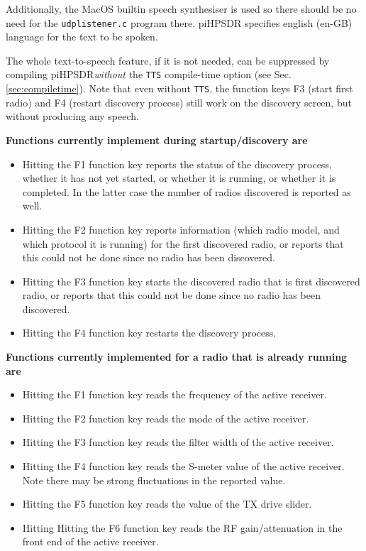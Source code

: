\documentclass[12pt]{book}
\def\rett#1{\texttt{\color{red}#1}}
\def\pH{pi\-HPSDR\xspace}
\begin{document}
Additionally, the MacOS builtin speech synthesiser is used so there should be no need
for the \texttt{udplistener.c} program there. \pH specifies english (en-GB)
language for the text to be spoken.

The whole text-to-speech feature, if it is not needed, can be suppressed by compiling
\pH \textit{without} the \texttt{TTS} compile-time option (see Sec. \ref{sec:compiletime}).
Note that even without \texttt{TTS},
the function keys F3 (start first radio) and F4 (restart
discovery process) still work on the discovery screen, but without producing any speech.

\textbf{Functions currently implement during startup/discovery are}

\begin{itemize}
\item[\rett{F1}]{Hitting the F1 function key reports the status of the discovery process,
whether it has not yet started, or whether it is running, or whether it is completed.
In the latter case the number of radios discovered is reported as well.}

\item[\rett{F2}]{Hitting the F2 function key reports information (which radio model, and
which protocol it is running) for the first discovered radio,
or reports that  this could not be done since no radio has been
discovered.}

\item[\rett{F3}]{Hitting the F3 function key starts the discovered radio that is first
discovered radio, or reports that  this could not be done since no radio has been
discovered.}
\item[\rett{F4}]{Hitting the F4 function key restarts the discovery process.}
\end{itemize}

\textbf{Functions currently implemented for a radio that is  already running are}

\begin{itemize}
\item[\rett{F1}]{Hitting the F1 function key reads the frequency of the active receiver.}

\item[\rett{F2}]{Hitting the F2 function key reads the mode of the active receiver.}

\item[\rett{F3}]{Hitting the F3 function key reads the filter width of the active receiver.}

\item[\rett{F4}]{Hitting the F4 function key reads the S-meter value of the active receiver.
Note there may be strong fluctuations in the reported value.}

\item[\rett{F5}]{Hitting the F5 function key reads the value of the TX drive slider.}

\item[\rett{F6}]{Hitting Hitting the F6 function key reads the RF gain/attenuation in the front
end of the active receiver.}
\end{itemize}
\end{document}
